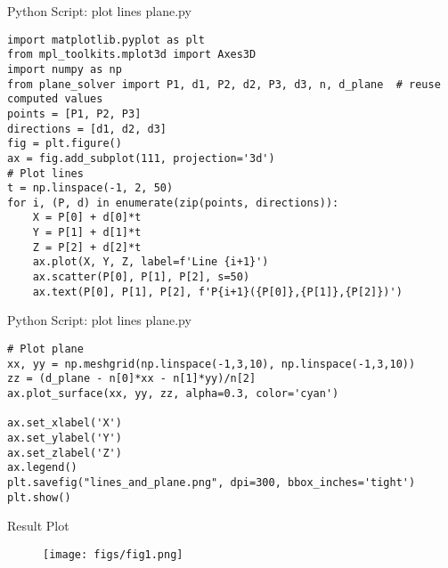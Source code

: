 \documentclass{beamer}
\numberwithin{equation}{section}
\theoremstyle{remark}
\begin{document}
\begin{frame}[fragile]{Python Script: plot lines plane.py}
\begin{verbatim}
import matplotlib.pyplot as plt
from mpl_toolkits.mplot3d import Axes3D
import numpy as np
from plane_solver import P1, d1, P2, d2, P3, d3, n, d_plane  # reuse computed values
points = [P1, P2, P3]
directions = [d1, d2, d3]
fig = plt.figure()
ax = fig.add_subplot(111, projection='3d')
# Plot lines
t = np.linspace(-1, 2, 50)
for i, (P, d) in enumerate(zip(points, directions)):
    X = P[0] + d[0]*t
    Y = P[1] + d[1]*t
    Z = P[2] + d[2]*t
    ax.plot(X, Y, Z, label=f'Line {i+1}')
    ax.scatter(P[0], P[1], P[2], s=50)
    ax.text(P[0], P[1], P[2], f'P{i+1}({P[0]},{P[1]},{P[2]})')
\end{verbatim}
\end{frame}
\begin{frame}[fragile]{Python Script: plot lines plane.py}
\begin{verbatim}
# Plot plane
xx, yy = np.meshgrid(np.linspace(-1,3,10), np.linspace(-1,3,10))
zz = (d_plane - n[0]*xx - n[1]*yy)/n[2]
ax.plot_surface(xx, yy, zz, alpha=0.3, color='cyan')

ax.set_xlabel('X')
ax.set_ylabel('Y')
ax.set_zlabel('Z')
ax.legend()
plt.savefig("lines_and_plane.png", dpi=300, bbox_inches='tight')
plt.show()
\end{verbatim}
\end{frame}

\begin{frame}{Result Plot}
 \begin{figure}[H]
     \centering
     \texttt{[image: figs/fig1.png]}
     \caption*{}
     \label{fig:fig1}
 \end{figure}
 
\end{frame}
\end{document}
